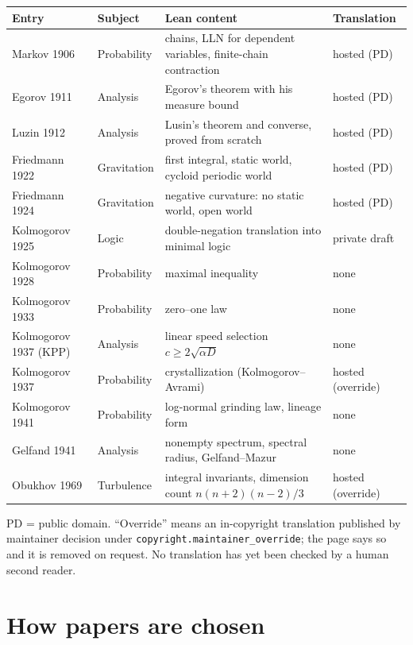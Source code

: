 \documentclass[11pt]{article}
\begin{document}
\medskip
\begin{tabularx}{\linewidth}{@{}l l Y l@{}}
\toprule
Entry & Subject & Lean content & Translation \\
\midrule
Markov 1906 & Probability & chains, LLN for dependent variables, finite-chain contraction & hosted (PD) \\
Egorov 1911 & Analysis & Egorov's theorem with his measure bound & hosted (PD) \\
Luzin 1912 & Analysis & Lusin's theorem and converse, proved from scratch & hosted (PD) \\
Friedmann 1922 & Gravitation & first integral, static world, cycloid periodic world & hosted (PD) \\
Friedmann 1924 & Gravitation & negative curvature: no static world, open world & hosted (PD) \\
Kolmogorov 1925 & Logic & double-negation translation into minimal logic & private draft \\
Kolmogorov 1928 & Probability & maximal inequality & none \\
Kolmogorov 1933 & Probability & zero--one law & none \\
Kolmogorov 1937 (KPP) & Analysis & linear speed selection $c\ge 2\sqrt{\alpha D}$ & none \\
Kolmogorov 1937 & Probability & crystallization (Kolmogorov--Avrami) & hosted (override) \\
Kolmogorov 1941 & Probability & log-normal grinding law, lineage form & none \\
Gelfand 1941 & Analysis & nonempty spectrum, spectral radius, Gelfand--Mazur & none \\
Obukhov 1969 & Turbulence & integral invariants, dimension count $n(n+2)(n-2)/3$ & hosted (override) \\
\bottomrule
\end{tabularx}

\medskip\noindent
PD = public domain. ``Override'' means an in-copyright translation published by maintainer decision under \texttt{copyright.maintainer\_override}; the page says so and it is removed on request. No translation has yet been checked by a human second reader.

\section{How papers are chosen}
\end{document}
